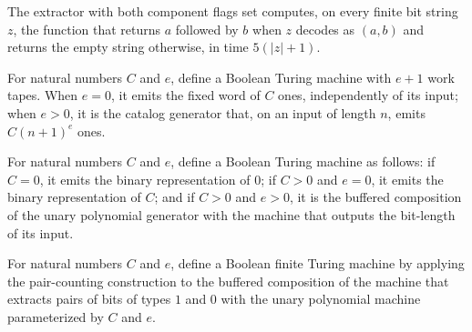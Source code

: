 \begin{theorem}
\label{Turing.FinTM.pairExtractTM_concat}
\leanok
{}
The extractor with both component flags set computes, on every finite bit string $z$,
the function that returns $a$ followed by $b$ when $z$ decodes as $(a,b)$ and returns
the empty string otherwise, in time $5(|z|+1)$.
\end{theorem}

\begin{definition}
\label{Turing.FinTM.polyUnaryTM}
\leanok
{}
For natural numbers $C$ and $e$, define a Boolean Turing machine with $e+1$ work tapes.
When $e=0$, it emits the fixed word of $C$ ones, independently of its input; when $e>0$,
it is the catalog generator that, on an input of length $n$, emits $C(n+1)^e$ ones.
\end{definition}

\begin{definition}
\label{Turing.FinTM.polyBitsTM}
\leanok
{}
For natural numbers $C$ and $e$, define a Boolean Turing machine as follows: if $C=0$,
it emits the binary representation of $0$; if $C>0$ and $e=0$, it emits the binary
representation of $C$; and if $C>0$ and $e>0$, it is the buffered composition of the
unary polynomial generator with the machine that outputs the bit-length of its input.
\end{definition}

\begin{definition}
\label{Turing.FinTM.pairLenCheckTM}
\leanok
{}
For natural numbers $C$ and $e$, define a Boolean finite Turing machine by applying the
pair-counting construction to the buffered composition of the machine that extracts
pairs of bits of types $1$ and $0$ with the unary polynomial machine parameterized by
$C$ and $e$.
\end{definition}

